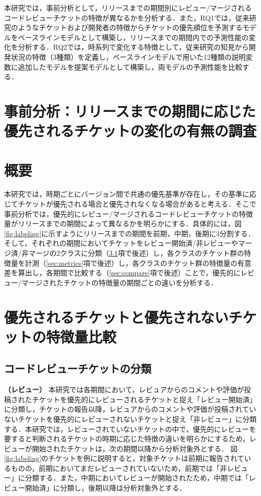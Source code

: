 \documentclass[submit]{ipsj}
\begin{document}
本研究では，事前分析として，リリースまでの期間別にレビュー/マージされるコードレビューチケットの特徴が異なるかを分析する．また，RQ1では，従来研究\cite{prioritizer}のようなチケットおよび開発者の特徴からチケットの優先順位を予測するモデルをベースラインモデルとして構築し，リリースまでの期間内での予測性能の変化を分析する．RQ2では，時系列で変化する特徴として，従来研究\cite{integrator}\cite{release_merge}の知見から開発状況の特徴（3種類）を定義し，ベースラインモデルで用いた12種類の説明変数に追加したモデルを提案モデルとして構築し，両モデルの予測性能を比較する．



\section{事前分析：リリースまでの期間に応じた優先されるチケットの変化の有無の調査}\label{sec:pre_analysis}

\section{概要}
本研究では，時期ごとにバージョン間で共通の優先基準が存在し，その基準に応じてチケットが優先される場合と優先されなくなる場合があると考える．そこで事前分析では，優先的にレビュー/マージされるコードレビューチケットの特徴量がリリースまでの期間によって異なるかを明らかにする．具体的には，図\ref{fig:labeling}に示すようにリリースまでの期間を前期，中期，後期に3分割する．そして，それぞれの期間においてチケットをレビュー開始済/非レビューやマージ済/非マージの2クラスに分類（\ref{sec:bunrui}項で後述）し，各クラスのチケット群の特徴量を計測（\ref{sec:metrics}項で後述）し，各クラスのチケット群の特徴量の有意差を算出し，各期間で比較する（\ref{sec:compare}項で後述）ことで，優先的にレビュー/マージされたチケットの特徴量の期間ごとの違いを分析する．

\section{優先されるチケットと優先されないチケットの特徴量比較}
\subsection{コードレビューチケットの分類}\label{sec:bunrui}
\textbf{（レビュー）} 本研究では各期間において，レビュアからのコメントや評価が投稿されたチケットを優先的にレビューされるチケットと捉え「レビュー開始済」に分類し，チケットの報告以降，レビュアからのコメントや評価が投稿されていないチケットを優先的にレビューされないチケットと捉え「非レビュー」に分類する．本研究では，レビューされていないチケットの中で，優先的にレビューを要すると判断されるチケットの時期に応じた特徴の違いを明らかにするため，レビューが開始されたチケットは，次の期間以降から分析対象外とする．
図\ref{fig:labeling}のチケットを例に説明すると，対象チケットは前期に報告されているものの，前期においてまだレビューされていないため，前期では「非レビュー」に分類する．また，中期においてレビューが開始されたため，中期では「レビュー開始済」に分類し，後期以降は分析対象外とする．
\end{document}

